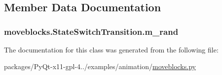 \subsection{Member Data Documentation}
\hypertarget{classmoveblocks_1_1StateSwitchTransition_a46d6eb4b55c5a9a2c3b85bc07535f07c}{}
\subsubsection[{m\+\_\+rand}]{\setlength{\rightskip}{0pt plus 5cm}moveblocks.\+State\+Switch\+Transition.\+m\+\_\+rand}\label{classmoveblocks_1_1StateSwitchTransition_a46d6eb4b55c5a9a2c3b85bc07535f07c}


The documentation for this class was generated from the following file\+:\begin{DoxyCompactItemize}
\item 
packages/\+Py\+Qt-\/x11-\/gpl-\/4../examples/animation/\hyperlink{moveblocks_8py}{moveblocks.\+py}\end{DoxyCompactItemize}
